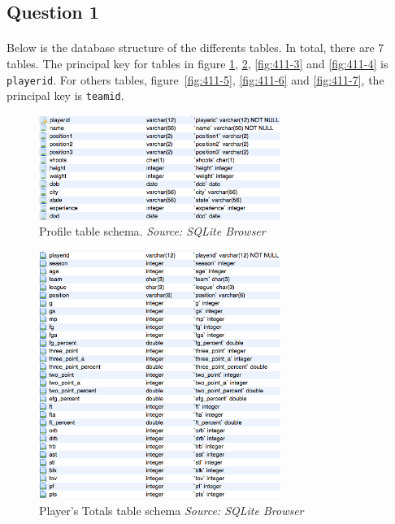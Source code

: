 \subsection{Question 1}
\label{subsec:411}

\paragraph{}Below is the database structure of the differents tables. In total, there are 7 tables. The principal key for tables in figure \ref{fig:411-1}, \ref{fig:411-2}, \ref{fig:411-3} and \ref{fig:411-4} is \texttt{playerid}. For others tables, figure~\ref{fig:411-5}, \ref{fig:411-6} and \ref{fig:411-7}, the principal key is \texttt{teamid}.

\begin{figure}[h!]
	\begin{center}
		\includegraphics[width=0.7\textwidth]{./images/profile}
		\caption{Profile table schema. \textit{Source: SQLite Browser}}
		\label{fig:411-1}
	\end{center}
\end{figure}

\begin{figure}[h!]
	\begin{center}
		\includegraphics[width=0.7\textwidth]{./images/player_total}
		\caption{Player's Totals table schema \textit{Source: SQLite Browser}}
		\label{fig:411-2}
	\end{center}
\end{figure}

